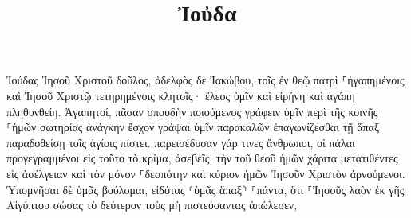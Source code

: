 \documentclass{openreader}
\title{Ἰοὐδα}
\date{}
\begin{document}
\maketitle
\raggedbottom 
\fontsize{16pt}{24pt}\selectfont


Ἰούδας Ἰησοῦ Χριστοῦ δοῦλος, ἀδελφὸς δὲ Ἰακώβου, τοῖς ἐν θεῷ πατρὶ ⸀ἠγαπημένοις καὶ Ἰησοῦ Χριστῷ τετηρημένοις κλητοῖς· 
ἔλεος ὑμῖν καὶ εἰρήνη καὶ ἀγάπη πληθυνθείη. 
Ἀγαπητοί, πᾶσαν σπουδὴν ποιούμενος γράφειν ὑμῖν περὶ τῆς κοινῆς ⸀ἡμῶν σωτηρίας ἀνάγκην ἔσχον γράψαι ὑμῖν παρακαλῶν ἐπαγωνίζεσθαι τῇ ἅπαξ παραδοθείσῃ τοῖς ἁγίοις πίστει. 
παρεισέδυσαν γάρ τινες ἄνθρωποι, οἱ πάλαι προγεγραμμένοι εἰς τοῦτο τὸ κρίμα, ἀσεβεῖς, τὴν τοῦ θεοῦ ἡμῶν χάριτα μετατιθέντες εἰς ἀσέλγειαν καὶ τὸν μόνον ⸀δεσπότην καὶ κύριον ἡμῶν Ἰησοῦν Χριστὸν ἀρνούμενοι. 
Ὑπομνῆσαι δὲ ὑμᾶς βούλομαι, εἰδότας ⸂ὑμᾶς ἅπαξ⸃ ⸀πάντα, ὅτι ⸀Ἰησοῦς λαὸν ἐκ γῆς Αἰγύπτου σώσας τὸ δεύτερον τοὺς μὴ πιστεύσαντας ἀπώλεσεν, 
\end{document}
